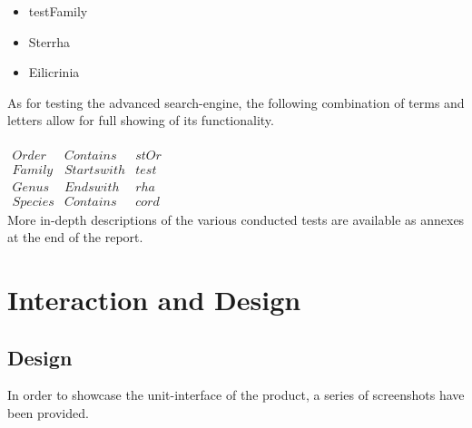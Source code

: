 \documentclass[12pt,a4paper]{article}
\begin{document}
\begin{itemize}
	\item testFamily
	\item Sterrha
	\item Eilicrinia
\end{itemize}

As for testing the advanced search-engine, the following combination of terms and letters allow for full showing of its functionality.
\\\\
$
\begin{array}{c|c|c}
Order & Contains & stOr \\ 
Family & Starts with & test \\ 
Genus & Ends with & rha \\ 
Species & Contains & cord
\end{array}
$
\\

More in-depth descriptions of the various conducted tests are available as annexes at the end of the report.

\newpage
\section{Interaction and Design}
\subsection{Design}

In order to showcase the unit-interface of the product, a series of screenshots have been provided.
\end{document}
